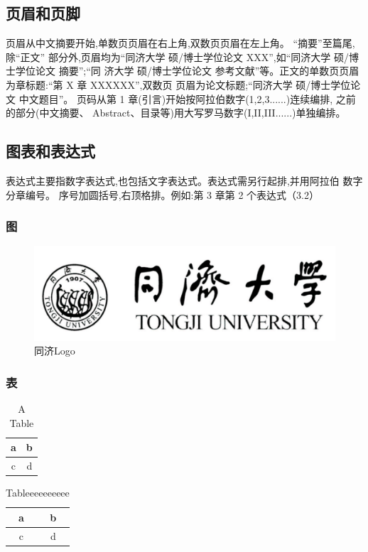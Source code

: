 	\subsection{页眉和页脚}
	页眉从中文摘要开始,单数页页眉在右上角,双数页页眉在左上角。
	“摘要”至篇尾,除“正文” 部分外,页眉均为“同济大学 
	硕/博士学位论文 XXX”,如“同济大学 硕/博士学位论文 摘要”;“同 济大学
	 硕/博士学位论文 参考文献”等。正文的单数页页眉为章标题:“第 X 章
	  XXXXXX”,双数页 页眉为论文标题;“同济大学 硕/博士学位论文 中文题目”。
页码从第 1 章(引言)开始按阿拉伯数字(1,2,3......)连续编排,
之前的部分(中文摘要、 Abstract、目录等)用大写罗马数字(I,II,III......)单独编排。



\subsection{图表和表达式}
	表达式主要指数字表达式,也包括文字表达式。表达式需另行起排,并用阿拉伯
	数字分章编号。 序号加圆括号,右顶格排。例如:第 3 章第 2 个表达式（3.2）
	
\subsubsection{图}
	\begin{figure}[h!]
		\centering
		\includegraphics[width=0.5\linewidth]{tongji-logo.png}
		\caption{同济Logo}
		\label{fig:tongji}
	\end{figure}

\subsubsection{表}
		\begin{table}[h!]
		\centering
			\caption{A Table}
			\begin{tabular}{c|c}
			a & b \\ \hline
			c & d \\ \hline
			\end{tabular}
		\end{table}
		
		\begin{table}[h!]
			\centering
				\caption{Tableeeeeeeeee}
				\label{tb:test_tb}
				\begin{tabular}{c|c}
				a & b \\ \hline
				c & d \\ \hline
				\end{tabular}
			\end{table}
			
